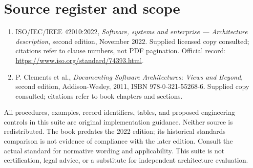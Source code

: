 \documentclass[11pt,letterpaper]{article}
\newcommand{\docsection}[1]{\Needspace{5\baselineskip}\section{#1}}
\begin{document}
\docsection{Source register and scope}
\begin{enumerate}
\item ISO/IEC/IEEE 42010:2022, \emph{Software, systems and enterprise --- Architecture description}, second edition, November 2022. Supplied licensed copy consulted; citations refer to clause numbers, not PDF pagination. Official record: \url{https://www.iso.org/standard/74393.html}.
\item P. Clements et al., \emph{Documenting Software Architectures: Views and Beyond}, second edition, Addison-Wesley, 2011, ISBN 978-0-321-55268-6. Supplied copy consulted; citations refer to book chapters and sections.
\end{enumerate}
All procedures, examples, record identifiers, tables, and proposed engineering controls in this suite are original implementation guidance. Neither source is redistributed. The book predates the 2022 edition; its historical standards comparison is not evidence of compliance with the later edition. Consult the actual standard for normative wording and applicability. This suite is not certification, legal advice, or a substitute for independent architecture evaluation.
\end{document}
